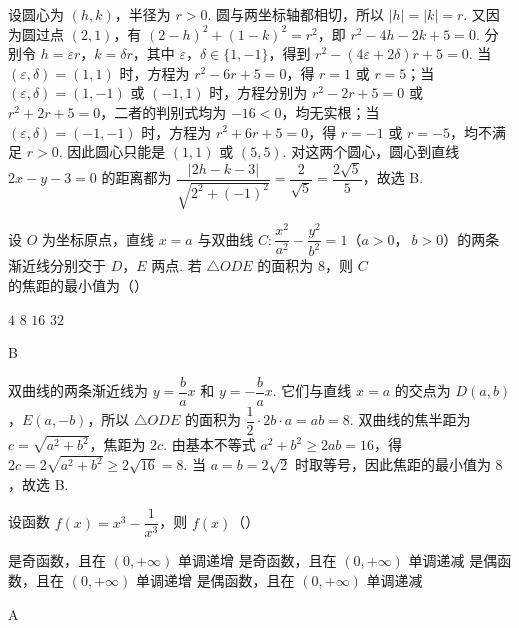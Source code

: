 \begin{solution}
设圆心为 \((h,k)\)，半径为 \(r>0\). 圆与两坐标轴都相切，所以 \(\lvert h\rvert=\lvert k\rvert=r\). 又因为圆过点 \((2,1)\)，有
\((2-h)^2+(1-k)^2=r^2\)，即 \(r^2-4h-2k+5=0\). 分别令 \(h=\varepsilon r\)，\(k=\delta r\)，其中 \(\varepsilon\)，\(\delta\in\{1,-1\}\)，得到 \(r^2-(4\varepsilon+2\delta)r+5=0\). 当 \((\varepsilon,\delta)=(1,1)\) 时，方程为 \(r^2-6r+5=0\)，得 \(r=1\) 或 \(r=5\)；当 \((\varepsilon,\delta)=(1,-1)\) 或 \((-1,1)\) 时，方程分别为 \(r^2-2r+5=0\) 或 \(r^2+2r+5=0\)，二者的判别式均为 \(-16<0\)，均无实根；当 \((\varepsilon,\delta)=(-1,-1)\) 时，方程为 \(r^2+6r+5=0\)，得 \(r=-1\) 或 \(r=-5\)，均不满足 \(r>0\). 因此圆心只能是 \((1,1)\) 或 \((5,5)\). 对这两个圆心，圆心到直线 \(2x-y-3=0\) 的距离都为 \(\dfrac{\lvert2h-k-3\rvert}{\sqrt{2^2+(-1)^2}}=\dfrac{2}{\sqrt5}=\dfrac{2\sqrt5}{5}\)，故选 B.
\end{solution}

\begin{problem}
设 \(O\) 为坐标原点，直线 \(x=a\) 与双曲线 \(C:\dfrac{x^2}{a^2}-\dfrac{y^2}{b^2}=1\)（\(a>0\)，\(\ b>0\)）的两条渐近线分别交于 \(D\)，\(E\) 两点. 若 \(\triangle ODE\) 的面积为 \(8\)，则 \(C\) 的焦距的最小值为（\quad）

\choices
    {\(4\)}
    {\(8\)}
    {\(16\)}
    {\(32\)}
\end{problem}

\begin{answer}
B
\end{answer}

\begin{solution}
双曲线的两条渐近线为 \(y=\dfrac ba x\) 和 \(y=-\dfrac ba x\). 它们与直线 \(x=a\) 的交点为 \(D(a,b)\)，\(E(a,-b)\)，所以 \(\triangle ODE\) 的面积为 \(\dfrac12\cdot2b\cdot a=ab=8\). 双曲线的焦半距为 \(c=\sqrt{a^2+b^2}\)，焦距为 \(2c\). 由基本不等式 \(a^2+b^2\geq2ab=16\)，得 \(2c=2\sqrt{a^2+b^2}\geq2\sqrt{16}=8\). 当 \(a=b=2\sqrt2\) 时取等号，因此焦距的最小值为 \(8\)，故选 B.
\end{solution}

\begin{problem}
设函数 \(f(x)=x^3-\dfrac{1}{x^3}\)，则 \(f(x)\)（\quad）

\choices
    {是奇函数，且在 \((0,+\infty)\) 单调递增}
    {是奇函数，且在 \((0,+\infty)\) 单调递减}
    {是偶函数，且在 \((0,+\infty)\) 单调递增}
    {是偶函数，且在 \((0,+\infty)\) 单调递减}
\end{problem}

\begin{answer}
A
\end{answer}

